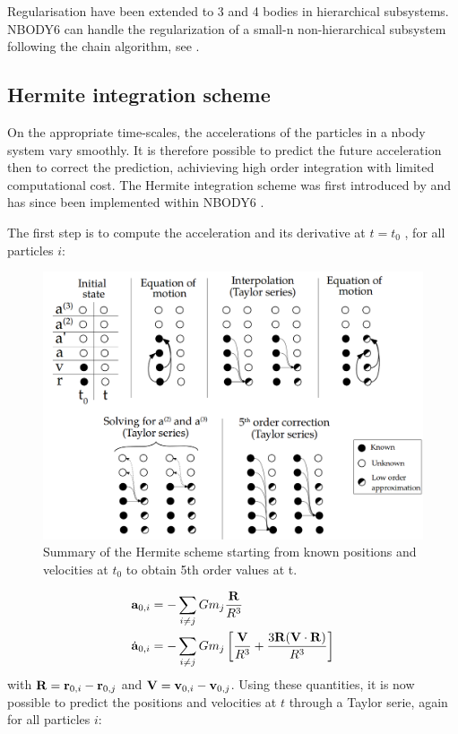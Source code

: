 Regularisation have been extended to 3 and 4 bodies in hierarchical subsystems. NBODY6 can handle the regularization of a small-n non-hierarchical subsystem following the chain algorithm, see \cite{Mikkola1993}.


\subsection{Hermite integration scheme}

On the appropriate time-scales, the accelerations of the particles in a nbody system vary smoothly. It is therefore possible to predict the future acceleration then to correct the prediction, achivieving high order integration with limited computational cost. The Hermite integration scheme was first  introduced by \cite{Makino1991} and has since been implemented within NBODY6 \citep{Aarseth2003,Nitadori2012}.


The first step is to compute the acceleration and its derivative at $t=t_0$ , for all particles $i$:

\begin{figure}
\center
\includegraphics[width=0.9\linewidth]{Figures/0_hermite_scheme.png}
\caption{Summary of the Hermite scheme starting from known positions and velocities at $t_0$ to obtain 5th order values at t.}
\label{Fig:0_hermite_scheme}
\end{figure} 
 

\begin{align}
\label{Eq:0_Hermite_acc1}
\bold{a}_{0,i} &= - \sum\limits_{i\neq j} G m_j \frac{\bold{R}}{R^3}\\
\label{Eq:0_Hermite_acc2}
\dot{\bold{a}}_{0,i} &=  - \sum\limits_{i\neq j} G m_j \left[ \frac{\bold{V}}{R^3}  + 
	\frac{ 3 \bold{R} ( \bold{V} \cdot \bold{R} )  }{R^3}\right]
\end{align}
with $\bold{R} = \bold{r}_{0,i} - \bold{r}_{0,j} $ and $\bold{V} = \bold{v}_{0,i} - \bold{v}_{0,j} $. Using these quantities, it is now possible to predict the positions and velocities at $t$ through a Taylor serie, again for all particles $i$:

